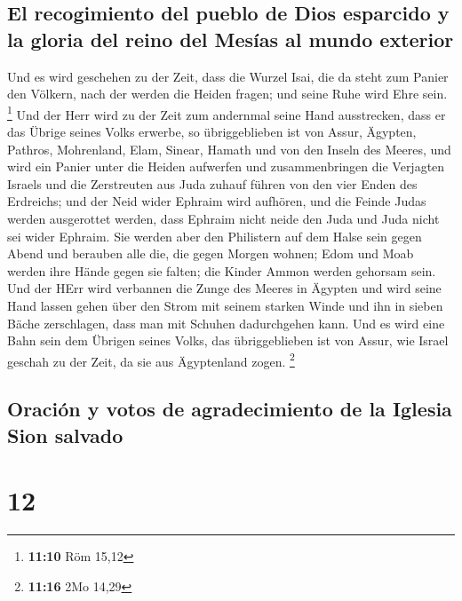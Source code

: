 \hypertarget{el-recogimiento-del-pueblo-de-dios-esparcido-y-la-gloria-del-reino-del-mesuxedas-al-mundo-exterior}{%
\subsection{El recogimiento del pueblo de Dios esparcido y la gloria del
reino del Mesías al mundo
exterior}\label{el-recogimiento-del-pueblo-de-dios-esparcido-y-la-gloria-del-reino-del-mesuxedas-al-mundo-exterior}}

 Und es wird geschehen zu der Zeit, dass die Wurzel Isai,
die da steht zum Panier den Völkern, nach der werden die Heiden fragen;
und seine Ruhe wird Ehre sein. \footnote{\textbf{11:10} Röm 15,12}
 Und der Herr wird zu der Zeit zum andernmal seine Hand
ausstrecken, dass er das Übrige seines Volks erwerbe, so übriggeblieben
ist von Assur, Ägypten, Pathros, Mohrenland, Elam, Sinear, Hamath und
von den Inseln des Meeres,  und wird ein Panier unter die
Heiden aufwerfen und zusammenbringen die Verjagten Israels und die
Zerstreuten aus Juda zuhauf führen von den vier Enden des Erdreichs;
 und der Neid wider Ephraim wird aufhören, und die Feinde
Judas werden ausgerottet werden, dass Ephraim nicht neide den Juda und
Juda nicht sei wider Ephraim.  Sie werden aber den
Philistern auf dem Halse sein gegen Abend und berauben alle die, die
gegen Morgen wohnen; Edom und Moab werden ihre Hände gegen sie falten;
die Kinder Ammon werden gehorsam sein.  Und der HErr wird
verbannen die Zunge des Meeres in Ägypten und wird seine Hand lassen
gehen über den Strom mit seinem starken Winde und ihn in sieben Bäche
zerschlagen, dass man mit Schuhen dadurchgehen kann.  Und
es wird eine Bahn sein dem Übrigen seines Volks, das übriggeblieben ist
von Assur, wie Israel geschah zu der Zeit, da sie aus Ägyptenland zogen.
\footnote{\textbf{11:16} 2Mo 14,29}

\hypertarget{oraciuxf3n-y-votos-de-agradecimiento-de-la-iglesia-sion-salvado}{%
\subsection{Oración y votos de agradecimiento de la Iglesia Sion
salvado}\label{oraciuxf3n-y-votos-de-agradecimiento-de-la-iglesia-sion-salvado}}

\hypertarget{section-11}{%
\section{12}\label{section-11}}

